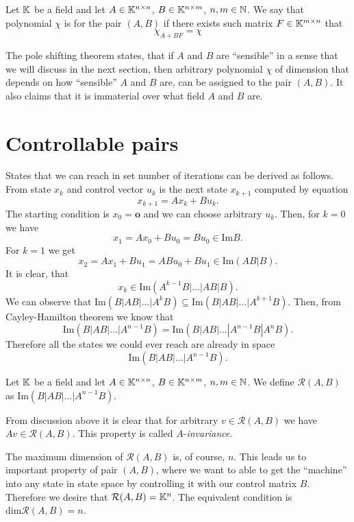\begin{definition}
    Let $\mathbb{K}$ be a field and let $A \in \mathbb{K}^{n \times n}$, $B \in \mathbb{K}^{n \times m}$, $n,m \in \mathbb{N}$. We say that polynomial $\chi$ is  for the pair $(A,B)$ if there exists such matrix $F\in\mathbb{K}^{m \times n}$ that $$\chi_{A+BF}=\chi$$
\end{definition}

The pole shifting theorem states, that if $A$ and $B$ are ``sensible'' in a sense that we will discuss in the next section, then arbitrary polynomial $\chi$ of dimension that depends on how ``sensible'' $A$ and $B$ are, can be assigned to the pair $(A,B)$. It also claims that it is immaterial over what field $A$ and $B$ are.

\section{Controllable pairs}

States that we can reach in set number of iterations can be derived as follows. From state $x_k$ and control vector $u_k$ is the next state $x_{k+1}$ computed by equation $$x_{k+1}=Ax_k+Bu_k.$$ The starting condition is $x_0=\textbf{o}$ and we can choose arbitrary $u_k$. Then, for $k=0$ we have $$x_1=Ax_0+Bu_0=Bu_0 \in \text{Im}B.$$ For $k=1$ we get $$x_2=Ax_1+Bu_1=ABu_0+Bu_1\in\text{Im}(AB|B).$$ It is clear, that $$x_k\in\text{Im}(A^{k-1}B|\ldots|AB|B).$$ We can observe that $\text{Im}(B|AB|\ldots|A^kB) \subseteq \text{Im}(B|AB|\ldots|A^{k+1}B)$. Then, from Cayley-Hamilton theorem we know that $$\text{Im}(B|AB|\ldots|A^{n-1}B)=\text{Im}(B|AB|\ldots|A^{n-1}B|A^nB).$$ Therefore all the states we could ever reach are already in space $$\text{Im}(B|AB|\ldots|A^{n-1}B).$$

\begin{definition}
	Let $\mathbb{K}$ be a field and let $A \in \mathbb{K}^{n \times n}$, $B \in \mathbb{K}^{n \times m}$, $n,m \in \mathbb{N}$. We define  $\mathcal{R}(A,B)$ as $\text{Im}(B|AB|\ldots|A^{n-1}B)$.
\end{definition}

From discussion above it is clear that for arbitrary $v\in\mathcal{R}(A,B)$ we have $Av\in\mathcal{R}(A,B)$. This property is called $A$-\textit{invariance}.

The maximum dimension of $\mathcal{R}(A,B)$ is, of course, $n$. This leads us to important property of pair $(A,B)$, where we want to able to get the ``machine'' into any state in state space by controlling it with our control matrix $B$. Therefore we desire that $\mathcal{R}(A,B)=\mathbb{K}^n$. The equivalent condition is $\text{dim}\mathcal{R}(A,B)=n$.

